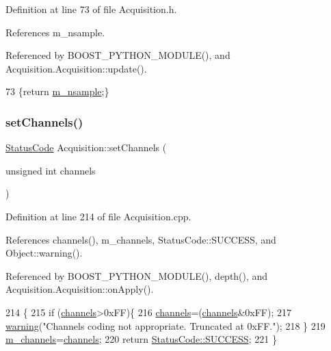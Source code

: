 Definition at line 73 of file Acquisition.\+h.



References m\+\_\+nsample.



Referenced by B\+O\+O\+S\+T\+\_\+\+P\+Y\+T\+H\+O\+N\+\_\+\+M\+O\+D\+U\+L\+E(), and Acquisition.\+Acquisition\+::update().


\begin{DoxyCode}
73 \{\textcolor{keywordflow}{return} \hyperlink{classAcquisition_a26d0f1a44309ffac49c365b7ee568ab2}{m\_nsample};\}
\end{DoxyCode}
\mbox{\label{classAcquisition_a3ee93f665573b4622bd9cba92c0cc04e}} 
\subsubsection{\texorpdfstring{set\+Channels()}{setChannels()}}
{\footnotesize\ttfamily \hyperlink{classStatusCode}{Status\+Code} Acquisition\+::set\+Channels (\begin{DoxyParamCaption}\item[{unsigned int}]{channels }\end{DoxyParamCaption})}



Definition at line 214 of file Acquisition.\+cpp.



References channels(), m\+\_\+channels, Status\+Code\+::\+S\+U\+C\+C\+E\+SS, and Object\+::warning().



Referenced by B\+O\+O\+S\+T\+\_\+\+P\+Y\+T\+H\+O\+N\+\_\+\+M\+O\+D\+U\+L\+E(), depth(), and Acquisition.\+Acquisition\+::on\+Apply().


\begin{DoxyCode}
214                                                          \{
215   \textcolor{keywordflow}{if} (\hyperlink{classAcquisition_a3041537afcb4dfe5c6940f0ef6829265}{channels}>0xFF)\{
216     \hyperlink{classAcquisition_a3041537afcb4dfe5c6940f0ef6829265}{channels}=(\hyperlink{classAcquisition_a3041537afcb4dfe5c6940f0ef6829265}{channels}&0xFF);
217     \hyperlink{classObject_a65cd4fda577711660821fd2cd5a3b4c9}{warning}(\textcolor{stringliteral}{"Channels coding not appropriate. Truncated at 0xFF."});
218   \}
219   \hyperlink{classAcquisition_aedc8b29f322ef00540797fbd0d5112d1}{m\_channels}=\hyperlink{classAcquisition_a3041537afcb4dfe5c6940f0ef6829265}{channels};
220   \textcolor{keywordflow}{return} \hyperlink{classStatusCode_a6f565cbeadc76d14c72f047e5e85eb4badd0da38d3ba0d922efd1f4619bc37ad8}{StatusCode::SUCCESS};
221 \}
\end{DoxyCode}
\mbox{\label{classAcquisition_a37e05315fc47958c290a7d938c61e067}} 
